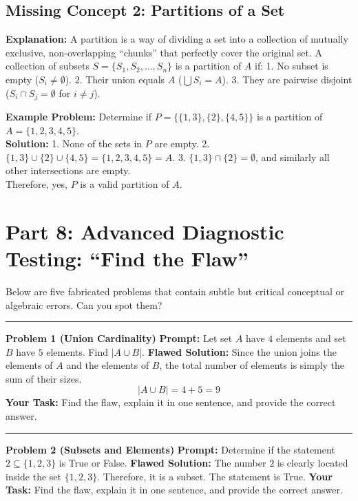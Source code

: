 \documentclass[12pt]{article}
\begin{document}
\subsection{Missing Concept 2: Partitions of a Set}
\textbf{Explanation:} A partition is a way of dividing a set into a collection of mutually exclusive, non-overlapping ``chunks'' that perfectly cover the original set. A collection of subsets $S = \{S_1, S_2, \dots, S_n\}$ is a partition of $A$ if:
1. No subset is empty ($S_i \neq \emptyset$).
2. Their union equals $A$ ($\bigcup S_i = A$).
3. They are pairwise disjoint ($S_i \cap S_j = \emptyset$ for $i \neq j$).

\textbf{Example Problem:} Determine if $P = \{\{1, 3\}, \{2\}, \{4, 5\}\}$ is a partition of $A = \{1, 2, 3, 4, 5\}$. \\
\textbf{Solution:} 
1. None of the sets in $P$ are empty.
2. $\{1, 3\} \cup \{2\} \cup \{4, 5\} = \{1, 2, 3, 4, 5\} = A$.
3. $\{1, 3\} \cap \{2\} = \emptyset$, and similarly all other intersections are empty. \\
Therefore, yes, $P$ is a valid partition of $A$.

\newpage
\section{Part 8: Advanced Diagnostic Testing: ``Find the Flaw''}

Below are five fabricated problems that contain subtle but critical conceptual or algebraic errors. Can you spot them?

\vspace{0.3cm}
\hrule
\vspace{0.3cm}
\textbf{Problem 1 (Union Cardinality)}
\textbf{Prompt:} Let set $A$ have $4$ elements and set $B$ have $5$ elements. Find $|A \cup B|$.
\textbf{Flawed Solution:} Since the union joins the elements of $A$ and the elements of $B$, the total number of elements is simply the sum of their sizes.
\[ |A \cup B| = 4 + 5 = 9 \]
\textbf{Your Task:} Find the flaw, explain it in one sentence, and provide the correct answer.

\vspace{0.3cm}
\hrule
\vspace{0.3cm}
\textbf{Problem 2 (Subsets and Elements)}
\textbf{Prompt:} Determine if the statement $2 \subseteq \{1, 2, 3\}$ is True or False.
\textbf{Flawed Solution:} The number $2$ is clearly located inside the set $\{1, 2, 3\}$. Therefore, it is a subset. The statement is True.
\textbf{Your Task:} Find the flaw, explain it in one sentence, and provide the correct answer.
\end{document}
